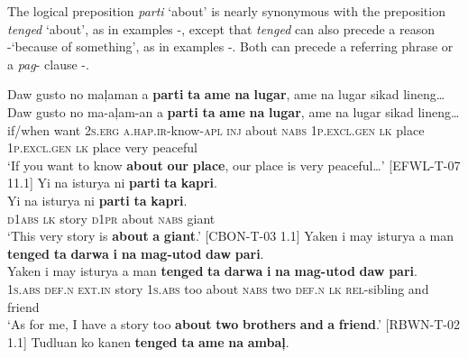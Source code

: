 The logical preposition \textit{parti} ‘about’ is nearly synonymous with the preposition \textit{tenged}  ‘about’, as in examples -, except that \textit{tenged} can also precede a reason -‘because of something’, as in examples -. Both can precede a referring phrase or a \textit{pag}{}- clause -.

\ea
\label{bkm:Ref423444497}
Daw  gusto  no  maļaman  a  \textbf{parti}  \textbf{ta}  \textbf{ame}  \textbf{na}  \textbf{lugar}, ame na lugar  sikad  lineng… \\\smallskip
 \gll Daw  gusto  no  ma-aļam-an  a  \textbf{parti}  \textbf{ta}  \textbf{ame}  \textbf{na}  \textbf{lugar}, ame na lugar  sikad  lineng… \\
if/when  want  2\textsc{s.erg}  \textsc{a.hap.ir}-know-\textsc{apl}  \textsc{inj}  about  \textsc{nabs}  1\textsc{p.excl.gen}  \textsc{lk}
place 1\textsc{p.excl.gen}  \textsc{lk}  place  very  peaceful \\
\glt `If you want  to know \textbf{about} \textbf{our} \textbf{place}, our place is very peaceful…’ [EFWL-T-07
11.1]
\z
\ea
Yi  na  isturya  ni  \textbf{parti}  \textbf{ta}  \textbf{kapri}. \\\smallskip
 \gll Yi  na  isturya  ni  \textbf{parti}  \textbf{ta}  \textbf{kapri}. \\
\textsc{d}1\textsc{abs}  \textsc{lk}  story  \textsc{d}1\textsc{pr}  about  \textsc{nabs}  giant \\
\glt ‘This very story is \textbf{about} \textbf{a} \textbf{giant}.’ [CBON-T-03 1.1]
\z
\ea
Yaken  i  may  isturya  a  man  \textbf{tenged}  \textbf{ta}  \textbf{darwa}  \textbf{i} \textbf{na}  \textbf{mag-utod}  \textbf{daw}  \textbf{pari}. \\\smallskip
 \gll Yaken  i  may  isturya  a  man  \textbf{tenged}  \textbf{ta}  \textbf{darwa}  \textbf{i} \textbf{na}  \textbf{mag-utod}  \textbf{daw}  \textbf{pari}. \\
1\textsc{s.abs}  \textsc{def.n}  \textsc{ext.in}  story  1\textsc{s.abs}  too  about  \textsc{nabs}  two  \textsc{def.n}
\textsc{lk}  \textsc{rel}-sibling  and  friend \\
\glt `As for me, I have a story too \textbf{about} \textbf{two} \textbf{brothers} \textbf{and} \textbf{a} \textbf{friend}.’ [RBWN-T-02 1.1]
\z
\ea
Tudluan  ko  kanen  \textbf{tenged}  \textbf{ta}  \textbf{ame}  \textbf{na}  \textbf{ambaļ}. \\\smallskip
